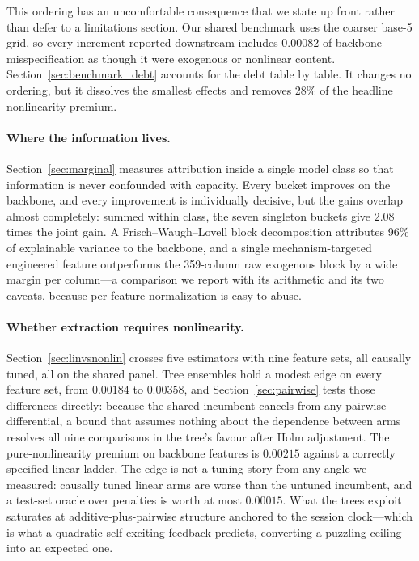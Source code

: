 This ordering has an uncomfortable consequence that we state up front rather than defer to a limitations section. Our shared benchmark uses the coarser base-5 grid, so every increment reported downstream includes $0.00082$ of backbone misspecification as though it were exogenous or nonlinear content. Section~\ref{sec:benchmark_debt} accounts for the debt table by table. It changes no ordering, but it dissolves the smallest effects and removes 28\% of the headline nonlinearity premium.

\paragraph{Where the information lives.} Section~\ref{sec:marginal} measures attribution inside a single model class so that information is never confounded with capacity. Every bucket improves on the backbone, and every improvement is individually decisive, but the gains overlap almost completely: summed within class, the seven singleton buckets give $2.08$ times the joint gain. A Frisch--Waugh--Lovell block decomposition attributes 96\% of explainable variance to the backbone, and a single mechanism-targeted engineered feature outperforms the 359-column raw exogenous block by a wide margin per column---a comparison we report with its arithmetic and its two caveats, because per-feature normalization is easy to abuse.

\paragraph{Whether extraction requires nonlinearity.} Section~\ref{sec:linvsnonlin} crosses five estimators with nine feature sets, all causally tuned, all on the shared panel. Tree ensembles hold a modest edge on every feature set, from $0.00184$ to $0.00358$, and Section~\ref{sec:pairwise} tests those differences directly: because the shared incumbent cancels from any pairwise differential, a bound that assumes nothing about the dependence between arms resolves all nine comparisons in the tree's favour after Holm adjustment. The pure-nonlinearity premium on backbone features is $0.00215$ against a correctly specified linear ladder. The edge is not a tuning story from any angle we measured: causally tuned linear arms are worse than the untuned incumbent, and a test-set oracle over penalties is worth at most $0.00015$. What the trees exploit saturates at additive-plus-pairwise structure anchored to the session clock---which is what a quadratic self-exciting feedback \citep{BlancDonierBouchaud2017} predicts, converting a puzzling ceiling into an expected one.

